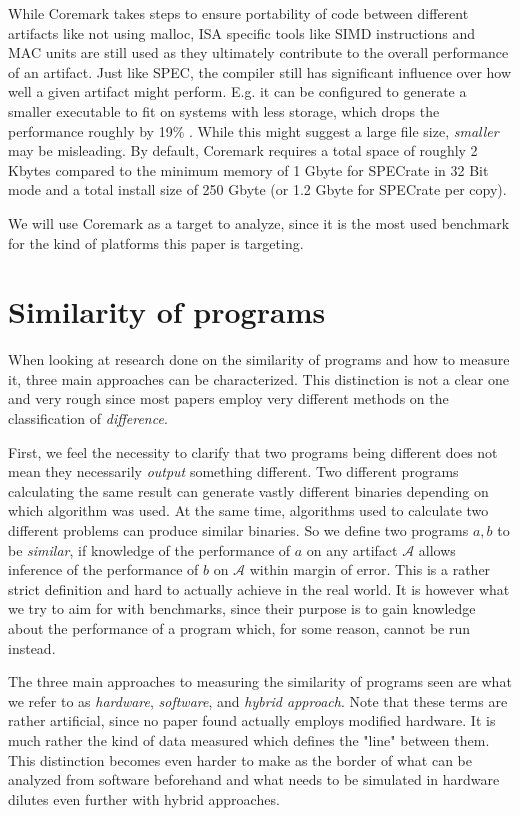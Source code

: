 \documentclass[../bachelor_paper.tex]{subfiles}
\begin{document}
While Coremark takes steps to ensure portability of code between different artifacts like not using malloc, \ac{ISA} specific tools like \ac{SIMD} instructions and \ac{MAC unit}s are still used as they ultimately contribute to the overall performance of an artifact. Just like \ac{SPEC}, the compiler still has significant influence over how well a given artifact might perform. E.g. it can be configured to generate a smaller executable to fit on systems with less storage, which drops the performance roughly by 19\% \cite{gal-onExploringCoremarkBenchmark2012}. While this might suggest a large file size, \textit{smaller} may be misleading. By default, Coremark requires a total space of roughly 2 Kbytes compared to the minimum memory of 1 Gbyte for \ac{SPEC}rate in 32 Bit mode and a total install size of 250 Gbyte (or 1.2 Gbyte for \ac{SPEC}rate per copy). \cite{SystemRequirementsCPU}

We will use Coremark as a target to analyze, since it is the most used benchmark for the kind of platforms this paper is targeting.

\section{Similarity of programs}
When looking at research done on the similarity of programs and how to measure it, three main approaches can be characterized. This distinction is not a clear one and very rough since most papers employ very different methods on the classification of \textit{difference}. 

First, we feel the necessity to clarify that two programs being different does not mean they necessarily \textit{output} something different. Two different programs calculating the same result can generate vastly different binaries depending on which algorithm was used. At the same time, algorithms used to calculate two different problems can produce similar binaries. So we define two programs $a,b$ to be \textit{similar}, if knowledge of the performance of $a$ on any artifact $\mathcal{A}$ allows inference of the performance of $b$ on $\mathcal{A}$ within margin of error. This is a rather strict definition and hard to actually achieve in the real world. It is however what we try to aim for with benchmarks, since their purpose is to gain knowledge about the performance of a program which, for some reason, cannot be run instead.

The three main approaches to measuring the similarity of programs seen are what we refer to as \textit{hardware}, \textit{software}, and \textit{hybrid approach}. Note that these terms are rather artificial, since no paper found actually employs modified hardware. It is much rather the kind of data measured which defines the "line" between them. This distinction becomes even harder to make as the border of what can be analyzed from software beforehand and what needs to be simulated in hardware dilutes even further with hybrid approaches.
\end{document}
